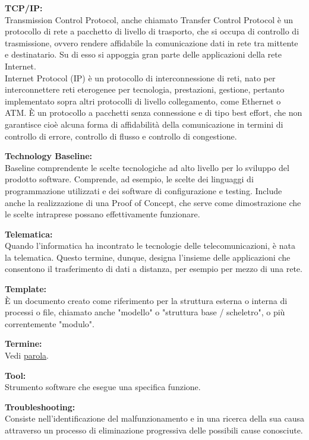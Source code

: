 \documentclass[a4paper, oneside, openany, dvipsnames, table]{article}
\begin{document}
\textbf{TCP/IP:}\\	Transmission Control Protocol, anche chiamato Transfer Control Protocol è un protocollo di rete a pacchetto di livello di trasporto, che si occupa di controllo di trasmissione, ovvero rendere affidabile la comunicazione dati in rete tra mittente e destinatario. Su di esso si appoggia gran parte delle applicazioni della rete Internet.
\\	Internet Protocol (IP) è un protocollo di interconnessione di reti, nato per interconnettere reti eterogenee per tecnologia, prestazioni, gestione, pertanto implementato sopra altri protocolli di livello collegamento, come Ethernet o ATM. \`E un protocollo a pacchetti  senza connessione e di tipo best effort, che non garantisce cioè alcuna forma di affidabilità della comunicazione in termini di controllo di errore, controllo di flusso e controllo di congestione.

 \textbf{Technology Baseline:} \\Baseline comprendente le scelte tecnologiche ad alto livello per lo sviluppo 
 del prodotto software. Comprende, ad esempio, le scelte dei linguaggi di programmazione utilizzati e dei 
 software di configurazione e testing. Include anche la realizzazione di una Proof of Concept, che serve 
 come dimostrazione che le scelte intraprese possano effettivamente funzionare.
 
\textbf{Telematica:}\\ Quando l'informatica ha incontrato le tecnologie delle telecomunicazioni, è nata la telematica. Questo termine, dunque, designa l'insieme delle applicazioni che consentono il trasferimento di dati a distanza, per esempio per mezzo di una rete. 

\textbf{Template:}\\ \`E un documento creato come riferimento per la struttura esterna o interna di processi o file, chiamato anche "modello" o "struttura base / scheletro", o più correntemente "modulo".

\textbf{Termine:}\\
Vedi \hyperref[par:parola]{parola}.

\textbf{Tool:}\\	Strumento software che esegue una specifica funzione.

\textbf{Troubleshooting:}\\	Consiste nell'identificazione del malfunzionamento e in una ricerca della sua causa attraverso un processo di eliminazione progressiva delle possibili cause conosciute.
\end{document}

